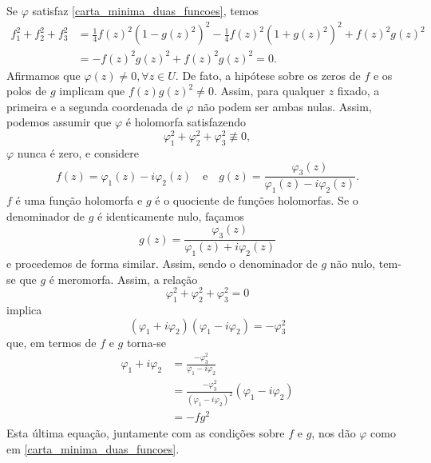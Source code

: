 \begin{demonstracao}
	Se $\varphi$ satisfaz \eqref{carta_minima_duas_funcoes}, temos
	\begin{align*}
	f_1^2 + f_2^2 + f_3^2 &= \frac{1}{4} f(z)^2 (1 - g(z)^2)^2 - \frac{1}{4} f(z)^2 (1 + g(z)^2)^2 + f(z)^2 g(z)^2\\
	&= -f(z)^2 g(z)^2 + f(z)^2 g(z)^2 =0.
	\end{align*}
	Afirmamos que $\varphi(z) \neq 0, \forall z \in U$. De fato, a hipótese sobre os zeros de $f$ e os polos de $g$ implicam que $f(z) g(z)^2 \neq 0$. Assim, para qualquer $z$ fixado, a primeira e a segunda coordenada de $\varphi$ não podem ser ambas nulas.
	Assim, podemos assumir que $\varphi$ é holomorfa satisfazendo
	\begin{equation*}
	\varphi_1^2 + \varphi_2^2 + \varphi_3^2 \not\equiv 0,
	\end{equation*}
	$\varphi$ nunca é zero, e considere
	\begin{equation*}
	f(z) = \varphi_1(z) - i \varphi_2(z) \quad \text{e} \quad
	g(z) = \frac{\varphi_3(z)}{\varphi_1(z) - i \varphi_2(z)}.
	\end{equation*}
	$f$ é uma função holomorfa e $g$ é o quociente de funções holomorfas. Se o denominador de $g$ é identicamente nulo, façamos
	\begin{equation*}
	g(z) = \frac{\varphi_3(z)}{\varphi_1(z) + i \varphi_2(z)}
	\end{equation*}
	e procedemos de forma similar.
	Assim, sendo o denominador de $g$ não nulo, tem-se que $g$ é meromorfa. Assim, a relação
	\begin{equation*}
	\varphi_1^2 + \varphi_2^2 + \varphi_3^2 = 0
	\end{equation*}
	implica
	\begin{equation*}
	(\varphi_1 + i \varphi_2)(\varphi_1 - i \varphi_2) = -\varphi_3^2
	\end{equation*}
	que, em termos de $f$ e $g$ torna-se
	\begin{align*}
	\varphi_1 + i \varphi_2 &= \frac{-\varphi_3^2}{\varphi_1 - i \varphi_2}\\
	&= \frac{-\varphi_3^2}{(\varphi_1 - i \varphi_2)^2} (\varphi_1 - i \varphi_2)\\
	&= -fg^2
	\end{align*}
	Esta última equação, juntamente com as condições sobre $f$ e $g$, nos dão $\varphi$ como em \eqref{carta_minima_duas_funcoes}.
\end{demonstracao}

